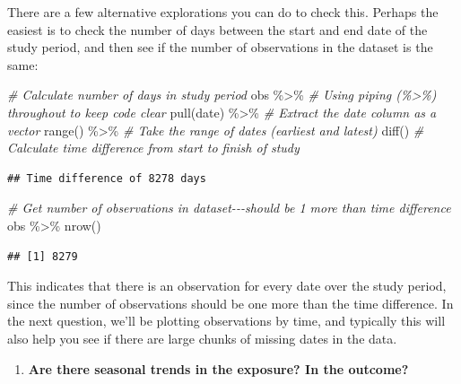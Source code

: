 \documentclass[
]{book}
\newenvironment{Shaded}{\begin{snugshade}}{\end{snugshade}}
\newcommand{\CommentTok}[1]{\textcolor[rgb]{0.56,0.35,0.01}{\textit{#1}}}
\newcommand{\FunctionTok}[1]{\textcolor[rgb]{0.00,0.00,0.00}{#1}}
\newcommand{\NormalTok}[1]{#1}
\newcommand{\SpecialCharTok}[1]{\textcolor[rgb]{0.00,0.00,0.00}{#1}}
\providecommand{\tightlist}{%
  \setlength{\itemsep}{0pt}\setlength{\parskip}{0pt}}
\begin{document}
There are a few alternative explorations you can do to check this. Perhaps the
easiest is to check
the number of days between the start and end date of the study period, and
then see if the number of observations in the dataset is the same:

\begin{Shaded}
\begin{Highlighting}[]
\CommentTok{\# Calculate number of days in study period}
\NormalTok{obs }\SpecialCharTok{\%\textgreater{}\%}            \CommentTok{\# Using piping (\%\textgreater{}\%) throughout to keep code clear}
  \FunctionTok{pull}\NormalTok{(date) }\SpecialCharTok{\%\textgreater{}\%}   \CommentTok{\# Extract the \textasciigrave{}date\textasciigrave{} column as a vector}
  \FunctionTok{range}\NormalTok{() }\SpecialCharTok{\%\textgreater{}\%}      \CommentTok{\# Take the range of dates (earliest and latest)}
  \FunctionTok{diff}\NormalTok{()           }\CommentTok{\# Calculate time difference from start to finish of study }
\end{Highlighting}
\end{Shaded}

\begin{verbatim}
## Time difference of 8278 days
\end{verbatim}

\begin{Shaded}
\begin{Highlighting}[]
\CommentTok{\# Get number of observations in dataset{-}{-}{-}should be 1 more than time difference}
\NormalTok{obs }\SpecialCharTok{\%\textgreater{}\%} 
  \FunctionTok{nrow}\NormalTok{()}
\end{Highlighting}
\end{Shaded}

\begin{verbatim}
## [1] 8279
\end{verbatim}

This indicates that there is an observation for every date over the study period,
since the number of observations should be one more than the time difference.
In the next question, we'll be plotting observations by time, and typically this
will also help you see if there are large chunks of missing dates in the data.

\begin{enumerate}
\def\labelenumi{\arabic{enumi}.}
\setcounter{enumi}{2}
\tightlist
\item
  \textbf{Are there seasonal trends in the exposure? In the outcome?}
\end{enumerate}
\end{document}

